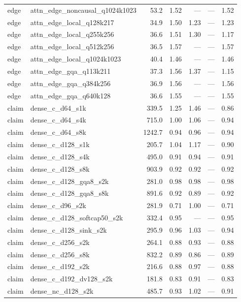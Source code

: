\begin{longtable}{@{}llrrrrr@{}}
edge & attn\_edge\_noncausal\_q1024k1023 & 53.2 & 1.52 & --- & --- & 1.52 \\
edge & attn\_edge\_local\_q128k217 & 34.9 & 1.50 & 1.23 & --- & 1.23 \\
edge & attn\_edge\_local\_q255k256 & 36.6 & 1.51 & 1.30 & --- & 1.17 \\
edge & attn\_edge\_local\_q512k256 & 36.5 & 1.57 & --- & --- & 1.57 \\
edge & attn\_edge\_local\_q1024k1023 & 40.4 & 1.46 & --- & --- & 1.46 \\
edge & attn\_edge\_gqa\_q113k211 & 37.3 & 1.56 & 1.37 & --- & 1.15 \\
edge & attn\_edge\_gqa\_q384k256 & 36.9 & 1.56 & --- & --- & 1.56 \\
edge & attn\_edge\_gqa\_q640k128 & 36.6 & 1.55 & --- & --- & 1.55 \\
claim & dense\_c\_d64\_s1k & 339.5 & 1.25 & 1.46 & --- & 0.86 \\
claim & dense\_c\_d64\_s4k & 715.0 & 1.00 & 1.06 & --- & 0.94 \\
claim & dense\_c\_d64\_s8k & 1242.7 & 0.94 & 0.96 & --- & 0.94 \\
claim & dense\_c\_d128\_s1k & 205.7 & 1.04 & 1.17 & --- & 0.90 \\
claim & dense\_c\_d128\_s4k & 495.0 & 0.91 & 0.94 & --- & 0.91 \\
claim & dense\_c\_d128\_s8k & 903.9 & 0.92 & 0.92 & --- & 0.92 \\
claim & dense\_c\_d128\_gqa8\_s2k & 281.0 & 0.98 & 0.98 & --- & 0.98 \\
claim & dense\_c\_d128\_gqa8\_s8k & 891.6 & 0.92 & 0.89 & --- & 0.92 \\
claim & dense\_c\_d96\_s2k & 281.9 & 0.71 & 1.00 & --- & 0.71 \\
claim & dense\_c\_d128\_softcap50\_s2k & 332.4 & 0.95 & --- & --- & 0.95 \\
claim & dense\_c\_d128\_sink\_s2k & 295.9 & 0.96 & 1.03 & --- & 0.94 \\
claim & dense\_c\_d256\_s2k & 264.1 & 0.88 & 0.93 & --- & 0.88 \\
claim & dense\_c\_d256\_s8k & 832.2 & 0.89 & 0.86 & --- & 0.89 \\
claim & dense\_c\_d192\_s2k & 216.6 & 0.88 & 0.97 & --- & 0.88 \\
claim & dense\_c\_d192\_dv128\_s2k & 181.8 & 0.83 & 0.91 & --- & 0.83 \\
claim & dense\_nc\_d128\_s2k & 485.7 & 0.93 & 1.02 & --- & 0.91 \\

\end{longtable}
